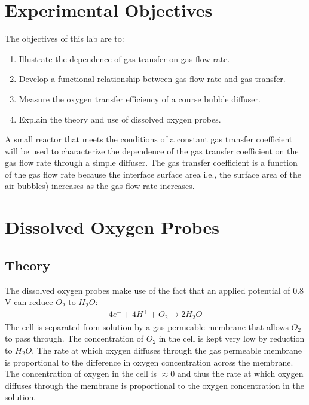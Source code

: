 \documentclass[letterpaper,10pt,english]{sphinxmanual}
\begin{document}
\section{Experimental Objectives}
\label{\detokenize{Gas_Transfer/Gas_Transfer:experimental-objectives}}\label{\detokenize{Gas_Transfer/Gas_Transfer:heading-gas-transfer-experimental-objectives}}
The objectives of this lab are to:
\begin{enumerate}
\item {} 
Illustrate the dependence of gas transfer on gas flow rate.

\item {} 
Develop a functional relationship between gas flow rate and gas transfer.

\item {} 
Measure the oxygen transfer efficiency of a course bubble diffuser.

\item {} 
Explain the theory and use of dissolved oxygen probes.

\end{enumerate}

A small reactor that meets the conditions of a constant gas transfer coefficient will be used to characterize the dependence of the gas transfer coefficient on the gas flow rate through a simple diffuser. The gas transfer coefficient is a function of the gas flow rate because the interface surface area i.e., the surface area of the air bubbles) increases as the gas flow rate increases.


\section{Dissolved Oxygen Probes}
\label{\detokenize{Gas_Transfer/Gas_Transfer:dissolved-oxygen-probes}}\label{\detokenize{Gas_Transfer/Gas_Transfer:heading-gas-transfer-dissolved-oxygen-probes}}

\subsection{Theory}
\label{\detokenize{Gas_Transfer/Gas_Transfer:id1}}
The dissolved oxygen probes make use of the fact that an applied potential of 0.8 V can reduce \(O_2\) to \(H_2O\):
\begin{equation}\label{equation:Gas_Transfer/Gas_Transfer:Gas_Transfer/Gas_Transfer:7}
\begin{split}4 e^- + 4 H^+ + O_2 \mathrm{\to} 2 H_2O\end{split}
\end{equation}
The cell is separated from solution by a gas permeable membrane that allows \(O_2\) to pass through. The concentration of \(O_2\) in the cell is kept very low by reduction to \(H_2O\). The rate at which oxygen diffuses through the gas permeable membrane is proportional to the difference in oxygen concentration across the membrane. The concentration of oxygen in the cell is \(\mathrm{\approx}0\) and thus the rate at which oxygen diffuses through the membrane is proportional to the oxygen concentration in the solution.
\end{document}
